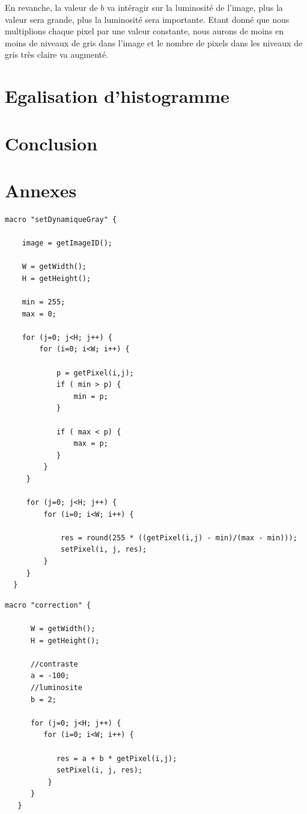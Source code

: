 \documentclass[a4paper,11pt]{article}
\begin{document}
  En revanche, la valeur de $b$ va intéragir sur la luminosité de l'image, plus la valeur sera grande,
  plus la luminosité sera importante.
  Etant donné que nous multiplions chaque pixel par une valeur constante, nous aurons de moins en moins
  de niveaux de gris dans l'image et le nombre de pixels dans les niveaux de gris très claire
  va augmenté.
  
  \section{Egalisation d'histogramme}
  
  \section*{Conclusion}
  
  \newpage
  
  \section*{Annexes}
  \begin{lstlisting}[caption=Macro d'extension d'histogramme]
  macro "setDynamiqueGray" {

    image = getImageID();

    W = getWidth();
    H = getHeight();

    min = 255;
    max = 0;

    for (j=0; j<H; j++) {
        for (i=0; i<W; i++) {

            p = getPixel(i,j);
            if ( min > p) {
                min = p;
            }

            if ( max < p) {
                max = p;
            }
         }
     }

     for (j=0; j<H; j++) {
         for (i=0; i<W; i++) {

             res = round(255 * ((getPixel(i,j) - min)/(max - min)));
             setPixel(i, j, res);
         }
     }
  }
  \end{lstlisting}
  
  \begin{lstlisting}[caption=Macro de la correction affine]
   macro "correction" {

      W = getWidth();
      H = getHeight();

      //contraste
      a = -100;
      //luminosite
      b = 2;

      for (j=0; j<H; j++) {
         for (i=0; i<W; i++) {

            res = a + b * getPixel(i,j);
            setPixel(i, j, res);
          }
      }
   }
  \end{lstlisting}

    
\end{document}

